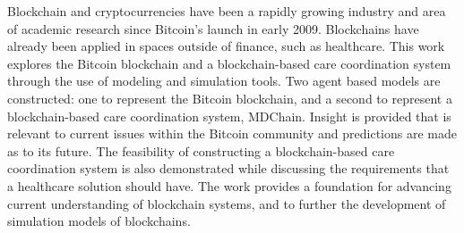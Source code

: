 \documentclass[12pt]{report}
\begin{document}
%
Blockchain and cryptocurrencies have been a rapidly growing industry and area of academic research since Bitcoin's launch in early 2009. Blockchains have already been applied in spaces outside of finance, such as healthcare. This work explores the Bitcoin blockchain and a blockchain-based care coordination system through the use of modeling and simulation tools. Two agent based models are constructed: one to represent the Bitcoin blockchain, and a second to represent a blockchain-based care coordination system, MDChain. Insight is provided that is relevant to current issues within the Bitcoin community and predictions are made as to its future.  The feasibility of constructing a blockchain-based care coordination system is also demonstrated while discussing the requirements that a healthcare solution should have. The work provides a foundation for advancing current understanding of blockchain systems, and to further the development of simulation models of blockchains.
%
\end{document}
